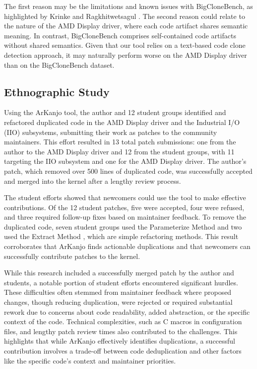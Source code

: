 \documentclass[conference]{IEEEtran}
\begin{document}
The first reason may be the limitations and known issues with BigCloneBench, as
highlighted by Krinke and Ragkhitwetsagul \cite{bigfail}. The
second reason could relate to the nature of the AMD Display driver, where each code artifact
shares semantic meaning. In contrast, BigCloneBench comprises self-contained code
artifacts without shared semantics. Given that our tool relies on a text-based code clone
detection approach, it may naturally perform worse on the AMD Display driver than on the
BigCloneBench dataset.

\subsection{Ethnographic Study}

Using the ArKanjo tool, the author and 12 student groups identified and refactored duplicated 
code in the AMD Display driver and the Industrial I/O (IIO) subsystems, submitting their work 
as patches to the community maintainers. This effort resulted in 13 total patch submissions: 
one from the author to the AMD Display driver and 12 from the student groups, with 11 targeting 
the IIO subsystem and one for the AMD Display driver. The author's patch, which removed over 
500 lines of duplicated code, was successfully accepted and merged into the kernel after a 
lengthy review process.

The student efforts showed that newcomers could use the tool to make effective contributions. 
Of the 12 student patches, five were accepted, four were refused, and three required follow-up 
fixes based on maintainer feedback. To remove the duplicated code, seven student groups used the 
Parameterize Method and two used the Extract Method \cite{refactorbook}, which are simple refactoring methods. 
This result corroborates that ArKanjo finds actionable duplications and that newcomers can 
successfully contribute patches to the kernel.

While this research included a successfully merged patch by the author and students,
a notable portion of student efforts encountered
significant hurdles. These difficulties often stemmed from maintainer feedback where
proposed changes, though reducing duplication, were rejected or required substantial
rework due to concerns about code readability, added abstraction, or the specific context
of the code. Technical complexities, such as C macros in configuration files, and lengthy
patch review times also contributed to the challenges. 
This highlights that while ArKanjo effectively identifies duplications, a successful 
contribution involves a trade-off between code deduplication and other factors like the 
specific code's context and maintainer priorities.
\end{document}
